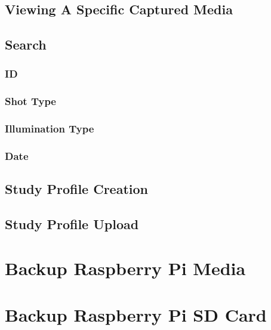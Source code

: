 \documentclass[12pt]{article}
\begin{document}
\subsection{Viewing A Specific Captured Media}
\subsection{Search}
\subsubsection{ID}
\subsubsection{Shot Type}
\subsubsection{Illumination Type}
\subsubsection{Date}
\subsection{Study Profile Creation}
\subsection{Study Profile Upload}
\section{Backup Raspberry Pi Media}
\section{Backup Raspberry Pi SD Card}
\end{document}
